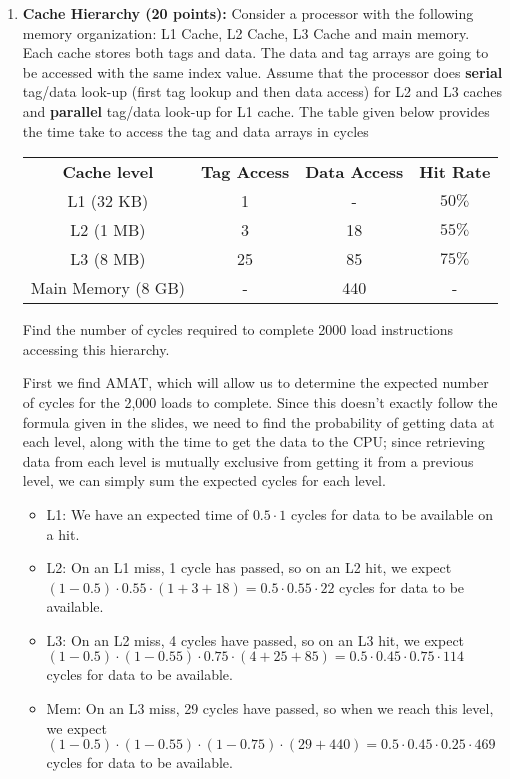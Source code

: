 \documentclass[a4paper, 11pt]{exam}
\begin{document}
\begin{enumerate}
 \item \textbf{Cache Hierarchy (20 points): } Consider a processor with the following memory
organization: L1 Cache, L2 Cache, L3 Cache and main memory. Each cache stores both tags
and data. The data and tag arrays are going to be accessed with the same index value. Assume
that the processor does \textbf{serial} tag/data look-up (first tag lookup and then data access) for L2
and L3 caches and \textbf{parallel} tag/data look-up for L1 cache. The table given below provides the
time take to access the tag and data arrays in cycles
\newline


\begin{center}
\begin{tabular}{|c|c|c|c|}
 \hline
 \textbf{Cache level} & \textbf{Tag Access} & \textbf{Data Access} & \textbf{Hit Rate} \\
 L1 (32 KB)  & 1 & - & $50\%$ \\
 \hline
 L2 (1 MB) & 3 & 18 & $55\%$ \\
 \hline
 L3 (8 MB) & 25 & 85 & $75\%$ \\
 \hline
 Main Memory (8 GB) & - & 440 & - \\
 \hline
\end{tabular}
\end{center}

Find the number of cycles required to complete 2000 load instructions accessing this
hierarchy. \newline

First we find AMAT, which will allow us to determine the expected number of cycles for the 2,000 loads to complete.
Since this doesn't exactly follow the formula given in the slides, we need to find the probability of getting data at each level, along with
the time to get the data to the CPU; since retrieving data from each level is mutually exclusive from getting it from a previous level, we can simply sum
the expected cycles for each level.
\begin{itemize}
\item L1: We have an expected time of $0.5\cdot1$ cycles for data to be available on a hit.
\item L2: On an L1 miss, 1 cycle has passed, so on an L2 hit, we expect $(1-0.5)\cdot0.55\cdot(1+3+18) = 0.5\cdot0.55\cdot22$ cycles for data to be available.
\item L3: On an L2 miss, 4 cycles have passed, so on an L3 hit, we expect $(1-0.5)\cdot(1-0.55)\cdot0.75\cdot(4+25+85) = 0.5\cdot0.45\cdot0.75\cdot114$ cycles for data to be available.
\item Mem: On an L3 miss, 29 cycles have passed, so when we reach this level, we expect $(1-0.5)\cdot(1-0.55)\cdot(1-0.75)\cdot(29+440) = 0.5\cdot0.45\cdot0.25\cdot469$ cycles for data to be available.
\end{itemize}


\end{enumerate}
\end{document}
